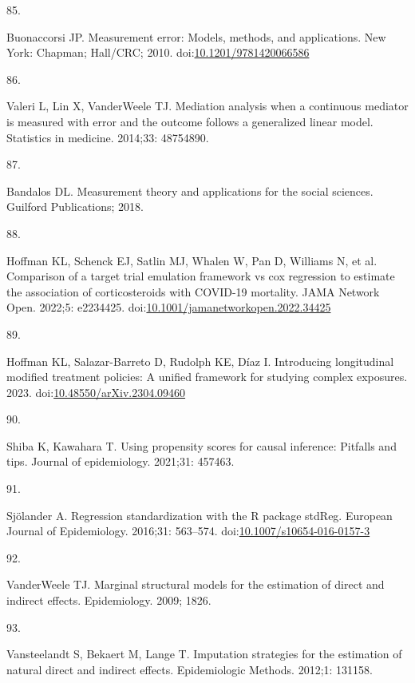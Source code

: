 \documentclass[
  singlecolumn]{article}
\newlength{\cslhangindent}
\newlength{\csllabelwidth}
\newlength{\cslentryspacingunit} %
\newenvironment{CSLReferences}[2] %
 {%
  \setlength{\parindent}{0pt}
  \ifodd #1
  \let\oldpar\par
  \def\par{\hangindent=\cslhangindent\oldpar}
  \fi
  \setlength{\parskip}{#2\cslentryspacingunit}
 }%
 {}
\newcommand{\CSLLeftMargin}[1]{\parbox[t]{\csllabelwidth}{#1}}
\newcommand{\CSLRightInline}[1]{\parbox[t]{\linewidth - \csllabelwidth}{#1}\break}
\begin{document}
\begin{CSLReferences}{0}{0}
\leavevmode{}%
\CSLLeftMargin{85. }%
\CSLRightInline{Buonaccorsi JP. Measurement error: Models, methods, and
applications. New York: Chapman; Hall/CRC; 2010.
doi:\href{https://doi.org/10.1201/9781420066586}{10.1201/9781420066586}}

\leavevmode{}%
\CSLLeftMargin{86. }%
\CSLRightInline{Valeri L, Lin X, VanderWeele TJ. Mediation analysis when
a continuous mediator is measured with error and the outcome follows a
generalized linear model. Statistics in medicine. 2014;33: 48754890. }

\leavevmode{}%
\CSLLeftMargin{87. }%
\CSLRightInline{Bandalos DL. Measurement theory and applications for the
social sciences. Guilford Publications; 2018. }

\leavevmode{}%
\CSLLeftMargin{88. }%
\CSLRightInline{Hoffman KL, Schenck EJ, Satlin MJ, Whalen W, Pan D,
Williams N, et al. Comparison of a target trial emulation framework vs
cox regression to estimate the association of corticosteroids with
COVID-19 mortality. JAMA Network Open. 2022;5: e2234425.
doi:\href{https://doi.org/10.1001/jamanetworkopen.2022.34425}{10.1001/jamanetworkopen.2022.34425}}

\leavevmode{}%
\CSLLeftMargin{89. }%
\CSLRightInline{Hoffman KL, Salazar-Barreto D, Rudolph KE, Díaz I.
Introducing longitudinal modified treatment policies: A unified
framework for studying complex exposures. 2023.
doi:\href{https://doi.org/10.48550/arXiv.2304.09460}{10.48550/arXiv.2304.09460}}

\leavevmode{}%
\CSLLeftMargin{90. }%
\CSLRightInline{Shiba K, Kawahara T. Using propensity scores for causal
inference: Pitfalls and tips. Journal of epidemiology. 2021;31: 457463.
}

\leavevmode{}%
\CSLLeftMargin{91. }%
\CSLRightInline{Sjölander A. Regression standardization with the R
package stdReg. European Journal of Epidemiology. 2016;31: 563--574.
doi:\href{https://doi.org/10.1007/s10654-016-0157-3}{10.1007/s10654-016-0157-3}}

\leavevmode{}%
\CSLLeftMargin{92. }%
\CSLRightInline{VanderWeele TJ. Marginal structural models for the
estimation of direct and indirect effects. Epidemiology. 2009; 1826. }

\leavevmode{}%
\CSLLeftMargin{93. }%
\CSLRightInline{Vansteelandt S, Bekaert M, Lange T. Imputation
strategies for the estimation of natural direct and indirect effects.
Epidemiologic Methods. 2012;1: 131158. }

\end{CSLReferences}
\end{document}

